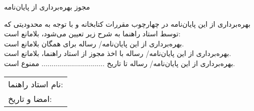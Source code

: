 \newpage
\thispagestyle{empty}
\begin{center}
\Large{مجوز بهره‌برداری از پایان‌نامه}
\end{center}
بهره‌برداری از این پایان‌نامه در چهارچوب مقررات كتابخانه و با توجه به محدودیتی كه توسط استاد راهنما به شرح زیر تعیین می‌شود، بلامانع است:\\
 بهره‌برداری از این پایان‌نامه/ رساله برای همگان بلامانع است.\\
 بهره‌برداری از این پایان‌نامه/ رساله با اخذ مجوز از استاد راهنما، بلامانع است.\\
 بهره‌برداری از این پایان‌نامه/ رساله تا تاریخ ................................ ممنوع است.
\\[1.0cm]
\begin{center}
\begin{tabular}{l}
نام استاد راهنما:
\\[0.5cm]
امضا و تاریخ:
\end{tabular}
\end{center}

\newpage

